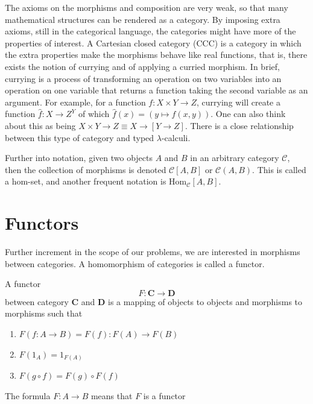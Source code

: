 The axioms on the morphisms and composition are very weak, so that many mathematical structures can be rendered as a category. By imposing extra axioms, still in the categorical language, the categories might have more of the properties of interest. A  Cartesian closed category  (CCC) is a category in which the extra properties make the morphisms behave like real functions, that is, there exists the notion of currying and of applying a curried morphism. In brief, currying is a process of transforming an operation on two variables into an operation on one variable that returns a function taking the second variable as an argument. For example, for a function $f:X\times Y\to Z$, currying will create a function $\hat{f}:X\to Z^{Y}$ of which $\hat{f}(x)=(y\mapsto f(x,y))$. One can also think about this as being $X\times Y\to Z\equiv X\to[Y\to Z]$. There is a close relationship between this type of category and typed $\lambda$-calculi. 

Further into notation, given two objects $A$ and $B$ in an arbitrary category $\mathcal{C}$, then the collection of morphisms is denoted $\mathcal{C}[A,B]$ or $\mathcal{C}(A,B)$. This is called a hom-set, and another frequent notation is $\mathrm{Hom}_{\mathcal{C}}[A,B]$.  

\section{Functors}

Further increment in the scope of our problems, we are interested in morphisms between categories. A homomorphism of categories is called a functor.

\begin{definition}
    A functor 
    \begin{equation*}
        F: \mathbf{C} \longrightarrow \mathbf{D}
    \end{equation*}
    between category $\mathbf{C}$ and $\mathbf{D}$ is a mapping of objects to objects and morphisms to morphisms such that 
    \begin{enumerate}
        \item $F(f:A\longrightarrow B)=F(f):F(A)\longrightarrow F(B)$
        \item $F(1_A) = 1_{F(A)}$
        \item $F(g \circ f)=F(g)\circ F(f)$
    \end{enumerate}
\end{definition}

The formula $F: A\longrightarrow B$ means that $F$ is a functor 

